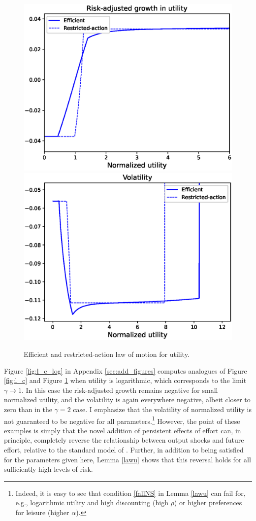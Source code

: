 \documentclass[11pt]{article}
\theoremstyle{plain}
\begin{document}
\begin{figure}[!htb]
\centering
\includegraphics[width=0.49\linewidth]{risk_adj_ex}
\includegraphics[width=0.49\linewidth]{sig_u_ex}
\caption{Efficient and restricted-action law of motion for utility.}\label{fig:law_u}
\end{figure} %

Figure \ref{fig:l_c_log} in Appendix \ref{sec:add_figures} computes analogues of Figure \ref{fig:l_c} and Figure \ref{fig:law_u} when utility is logarithmic, which corresponds to the limit $\gamma \rightarrow 1$. In this case the risk-adjusted growth remains negative for small normalized utility, and the volatility is again everywhere negative, albeit closer to zero than in the $\gamma=2$ case. I emphasize that the volatility of normalized utility is not guaranteed to be negative for all parameters.\footnote{Indeed, it is easy to see that condition \eqref{fallNS} in Lemma \ref{lawu} can fail for, e.g., logarithmic utility and high discounting (high $\rho$) or higher preferences for leisure (higher $\alpha$).} However, the point of these examples is simply that the novel addition of persistent effects of effort can, in principle, completely reverse the relationship between output shocks and future effort, relative to the standard model of \cite{sannikov_continuous-time_2008}. Further, in addition to being satisfied for the parameters given here, Lemma \ref{lawu} shows that this reversal holds for all sufficiently high levels of risk. 
\end{document}
